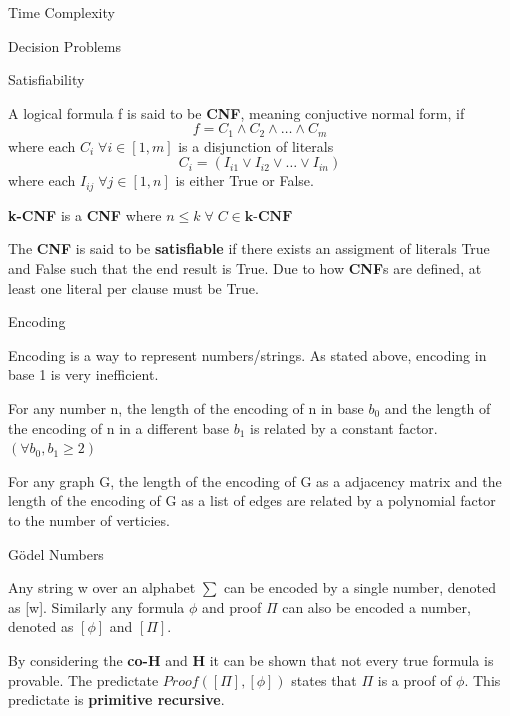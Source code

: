 \documentclass[12pt, letterpaper]{article}
\begin{document}
\begin{section}{Time Complexity}
\begin{subsection}{Decision Problems}
    \begin{subsubsection}{Satisfiability}

      A logical formula f is said to be \textbf{CNF}, meaning conjuctive normal form, if
      \[f = C_{1} \land C_{2} \land \dots \land C_{m}\]
      where each \(C_{i} \; \forall i \in [1, m]\) is a disjunction of literals
      \[C_{i} = (I_{i1} \lor I_{i2} \lor \dots \lor I_{in})\]
      where each \(I_{ij} \; \forall j \in [1, n]\) is either True or False.

      \textbf{k-CNF} is a \textbf{CNF} where \(n \leq k \; \forall \; C \in \textbf{k-CNF}\)

      The \textbf{CNF} is said to be \textbf{satisfiable} if there exists an
      assigment of literals True and False such that the end result is True.
      Due to how \textbf{CNF}s are defined, at least one literal per clause must be True.

    \end{subsubsection}

  \end{subsection}

  \begin{subsection}{Encoding}

    Encoding is a way to represent numbers/strings. As stated above, encoding
    in base 1 is very inefficient.

    For any number n, the length of the encoding of n in base \(b_{0}\) and the
    length of the encoding of n in a different base \(b_{1}\) is related by
    a constant factor. \((\forall b_{0}, b_{1} \geq 2)\)

    For any graph G, the length of the encoding of G as a adjacency matrix and
    the length of the encoding of G as a list of edges are related by
    a polynomial factor to the number of verticies.

    \begin{subsubsection}{Gödel Numbers}

      Any string w over an alphabet \(\sum\) can be encoded by a single number,
      denoted as [w]. Similarly any formula \(\phi\) and proof \(\Pi\)
      can also be encoded a number, denoted as \([\phi]\) and \([\Pi]\).

      By considering the \textbf{co-H} and \textbf{H} it can be shown that not
      every true formula is provable. The predictate %
      \textit{\(Proof([\Pi], [\phi])\)} states that \(\Pi\) is a proof of \(\phi\).
      This predictate is \textbf{primitive recursive}.


\end{subsubsection}
\end{subsection}
\end{section}
\end{document}
